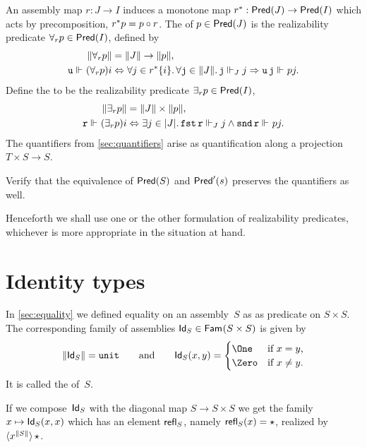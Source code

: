 An assembly map $r : J \to I$ induces a monotone map $\invim{r} : \Pred{J} \to \Pred{I}$ which acts by precomposition, $\invim{r} p = p \circ r$. The  of $p \in \Pred{J}$  is the realizability predicate $\forall_r p \in \Pred{I}$, defined by
%
\begin{align*}
  \T{\forall_r p} &= \T{J} \to \T{p}, \\
  \R{u} \rz (\forall_r p) i &\liff
    \all{j \in \invim{r} \set{i}}
    \all{\R{j} \in \T{J}}
    \R{j} \rz[J] j \lthen \R{u}\,\R{j} \rz p j.
\end{align*}
%
Define the  to be the realizability predicate $\exists_r p \in \Pred{I}$,
%
\begin{align*}
  \T{\exists_r p} &= \T{J} \times \T{p}, \\
  \R{r} \rz (\exists_r p) i &\liff
  \some{j \in \S{J}}
   \combFst\,\R{r} \rz[J] j
   \land
   \combSnd\,\R{r} \rz p j.
\end{align*}
%
The quantifiers from \cref{sec:quantifiers} arise as quantification along a projection $T \times S \to S$.

\begin{exercise}
  Verify that the equivalence of $\Pred{S}$ and $\PredT{s}$ preserves the quantifiers as well.
\end{exercise}

Henceforth we shall use one or the other formulation of realizability predicates, whichever is more appropriate in the situation at hand.


\section{Identity types}
\label{sec:identity-types}

In \cref{sec:equality} we defined equality on an assembly~$S$ as as predicate on $S \times S$. The corresponding family of assemblies $\Id[S] \in \Fam{S \times S}$ is given by
%
\begin{equation*}
  \T{\Id[S]} = \unit
  \qquad\text{and}\qquad
  \Id[S](x, y) =
  \begin{cases}
    \One & \text{if $x = y$,} \\
    \Zero & \text{if $x \neq y$.}
  \end{cases}
\end{equation*}
%
It is called the  of~$S$.

If we compose~$\Id[S]$ with the diagonal map $S \to S \times S$ we get the family $x \mapsto \Id[S](x,x)$ which has an element $\refl[S]$, namely $\refl[S](x) = \star$, realized by $\tpcalam{x}{\T{S}}{\ttunit}$.

